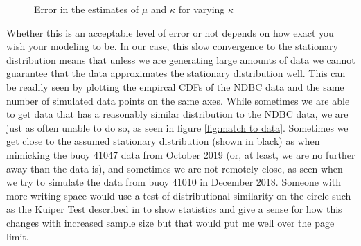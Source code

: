 \documentclass[12pt]{article}
\numberwithin{equation}{section}
\numberwithin{figure}{section}
\begin{document}
\begin{figure}[h]
\centering
{}
\caption{Error in the estimates of $\mu$ and $\kappa$ for varying $\kappa$}\label{fig:convergence}
\end{figure}

Whether this is an acceptable level of error or not depends on how exact you wish your modeling to be. In our case, this slow convergence to the stationary distribution means that unless we are generating large amounts of data we cannot guarantee that the data approximates the stationary distribution well. This can be readily seen by plotting the empircal CDFs of the NDBC data and the same number of simulated data points on the same axes. While sometimes we are able to get data that has a reasonably similar distribution to the NDBC data, we are just as often unable to do so, as seen in figure \ref{fig:match to data}. Sometimes we get close to the assumed stationary distribution (shown in black) as when mimicking the buoy 41047 data from October 2019 (or, at least, we are no further away than the data is), and sometimes we are not remotely close, as seen when we try to simulate the data from buoy 41010 in December 2018. Someone with more writing space would use a test of distributional similarity on the circle such as the Kuiper Test described in \cite{Kuiper} to show statistics and give a sense for how this changes with increased sample size but that would put me well over the page limit. 
\end{document}

